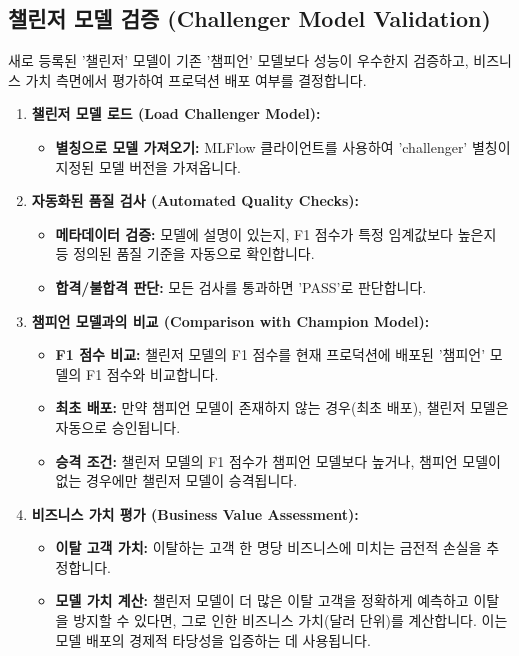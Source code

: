 \documentclass[11pt,a4paper]{article}
\theoremstyle{definition}
\begin{document}
\subsection{챌린저 모델 검증 (Challenger Model Validation)}

\begin{summarybox}
새로 등록된 '챌린저' 모델이 기존 '챔피언' 모델보다 성능이 우수한지 검증하고, 비즈니스 가치 측면에서 평가하여 프로덕션 배포 여부를 결정합니다.
\end{summarybox}

\begin{enumerate}
    \item \textbf{챌린저 모델 로드 (Load Challenger Model):}
    \begin{itemize}
        \item \textbf{별칭으로 모델 가져오기:} MLFlow 클라이언트를 사용하여 'challenger' 별칭이 지정된 모델 버전을 가져옵니다.
    \end{itemize}

    \item \textbf{자동화된 품질 검사 (Automated Quality Checks):}
    \begin{itemize}
        \item \textbf{메타데이터 검증:} 모델에 설명이 있는지, F1 점수가 특정 임계값보다 높은지 등 정의된 품질 기준을 자동으로 확인합니다.
        \item \textbf{합격/불합격 판단:} 모든 검사를 통과하면 'PASS'로 판단합니다.
    \end{itemize}

    \item \textbf{챔피언 모델과의 비교 (Comparison with Champion Model):}
    \begin{itemize}
        \item \textbf{F1 점수 비교:} 챌린저 모델의 F1 점수를 현재 프로덕션에 배포된 '챔피언' 모델의 F1 점수와 비교합니다.
        \item \textbf{최초 배포:} 만약 챔피언 모델이 존재하지 않는 경우(최초 배포), 챌린저 모델은 자동으로 승인됩니다.
        \item \textbf{승격 조건:} 챌린저 모델의 F1 점수가 챔피언 모델보다 높거나, 챔피언 모델이 없는 경우에만 챌린저 모델이 승격됩니다.
    \end{itemize}

    \item \textbf{비즈니스 가치 평가 (Business Value Assessment):}
    \begin{itemize}
        \item \textbf{이탈 고객 가치:} 이탈하는 고객 한 명당 비즈니스에 미치는 금전적 손실을 추정합니다.
        \item \textbf{모델 가치 계산:} 챌린저 모델이 더 많은 이탈 고객을 정확하게 예측하고 이탈을 방지할 수 있다면, 그로 인한 비즈니스 가치(달러 단위)를 계산합니다. 이는 모델 배포의 경제적 타당성을 입증하는 데 사용됩니다.
    \end{itemize}


\end{enumerate}
\end{document}
